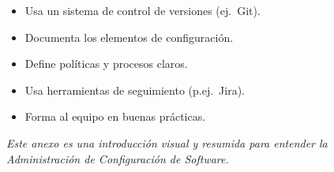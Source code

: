 \begin{multicols}{2}
    \vspace{0.5em}

    \begin{cajaroja}
        \begin{itemize}[leftmargin=*]
            \item Usa un sistema de control de versiones (ej.\ Git).
            \item Documenta los elementos de configuración.
            \item Define políticas y procesos claros.
            \item Usa herramientas de seguimiento (p.ej.\ Jira).
            \item Forma al equipo en buenas prácticas.
        \end{itemize}
    \end{cajaroja}

\end{multicols}

\vspace{1em}
\begin{center}
    \small\textit{Este anexo es una introducción visual y resumida para entender la Administración de Configuración de Software.}
\end{center}